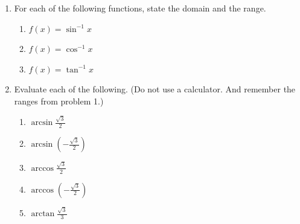 \documentclass[12pt]{article}
\newif\ifans
\begin{document}
\begin{enumerate}

\item For each of the following functions, state the domain and the range.

\begin{enumerate}

\item $\displaystyle f(x)=\sin^{-1}{x}$

\ifans \fbox{Domain: $[-1,1]$, Range: $\displaystyle \left[-\frac{\pi}{2},\frac{\pi}{2}\right]$} \fi

\item $\displaystyle f(x)=\cos^{-1}{x}$

\ifans \fbox{Domain: $[-1,1]$, Range: $\displaystyle [0,\pi]$} \fi

\item $\displaystyle f(x)=\tan^{-1}{x}$

\ifans \fbox{Domain: $(-\infty,\infty)$, Range: $\displaystyle \left(-\frac{\pi}{2},\frac{\pi}{2}\right)$} \fi

\end{enumerate}

\item Evaluate each of the following. (Do not use a calculator.  And remember the ranges from problem 1.)

\begin{enumerate}

\item $\displaystyle \arcsin{\frac{\sqrt{3}}{2}}$

\ifans \fbox{$\displaystyle \frac{\pi}{3}$} \fi

\item $\displaystyle \arcsin{\left(-\frac{\sqrt{3}}{2}\right)}$

\ifans \fbox{$\displaystyle -\frac{\pi}{3}$} \fi

\item $\displaystyle \arccos{\frac{\sqrt{3}}{2}}$

\ifans \fbox{$\displaystyle \frac{\pi}{6}$} \fi

\item $\displaystyle \arccos{\left(-\frac{\sqrt{3}}{2}\right)}$

\ifans \fbox{$\displaystyle \frac{5\pi}{6}$} \fi

\item $\displaystyle \arctan{\frac{\sqrt{3}}{3}}$ 

\ifans \fbox{$\displaystyle \frac{\pi}{6}$} \fi


\end{enumerate}
\end{enumerate}
\end{document}
